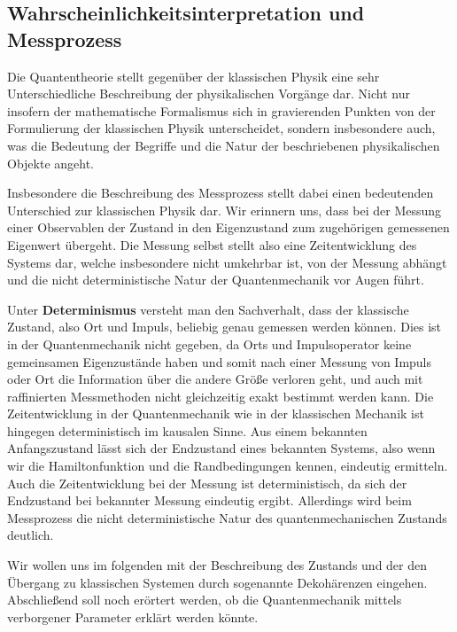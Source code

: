 %
%
%


\subsection{Wahrscheinlichkeitsinterpretation und Messprozess}

Die Quantentheorie stellt gegenüber der klassischen Physik eine sehr Unterschiedliche Beschreibung der physikalischen Vorgänge dar. Nicht nur insofern der mathematische Formalismus sich in gravierenden Punkten von der Formulierung der klassischen Physik unterscheidet, sondern insbesondere auch, was die Bedeutung der Begriffe und die Natur der beschriebenen physikalischen Objekte angeht. 

Insbesondere die Beschreibung des Messprozess stellt dabei einen bedeutenden Unterschied zur klassischen Physik dar. Wir erinnern uns, dass bei der Messung einer Observablen der Zustand in den Eigenzustand zum zugehörigen gemessenen Eigenwert übergeht. Die Messung selbst stellt also eine Zeitentwicklung des Systems dar, welche insbesondere nicht umkehrbar ist, von der Messung abhängt und die nicht deterministische Natur der Quantenmechanik vor Augen führt. 	

Unter {\bf Determinismus} versteht man den Sachverhalt, dass der klassische Zustand, also Ort und Impuls, beliebig genau gemessen werden können. Dies ist in der Quantenmechanik nicht gegeben, da Orts und Impulsoperator keine gemeinsamen Eigenzustände haben und somit nach einer Messung von Impuls oder Ort die Information über die andere Größe verloren geht, und auch mit raffinierten Messmethoden nicht gleichzeitig exakt bestimmt werden kann. Die Zeitentwicklung in der Quantenmechanik wie in der klassischen Mechanik ist hingegen deterministisch im kausalen Sinne. Aus einem bekannten Anfangszustand lässt sich der Endzustand eines bekannten Systems, also wenn wir die Hamiltonfunktion und die Randbedingungen kennen, eindeutig ermitteln. Auch die Zeitentwicklung bei der Messung ist deterministisch, da sich der Endzustand bei bekannter Messung eindeutig ergibt. Allerdings wird beim Messprozess die nicht deterministische Natur des quantenmechanischen Zustands deutlich.  

Wir wollen uns im folgenden mit der Beschreibung des Zustands und der den Übergang zu klassischen Systemen durch sogenannte Dekohärenzen eingehen. Abschließend soll noch erörtert werden, ob die Quantenmechanik mittels verborgener Parameter erklärt werden könnte. 



